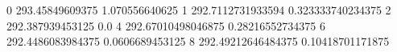 0 293.45849609375 1.070556640625
1 292.7112731933594 0.323333740234375
2 292.387939453125 0.0
4 292.67010498046875 0.28216552734375
6 292.4486083984375 0.0606689453125
8 292.49212646484375 0.10418701171875
